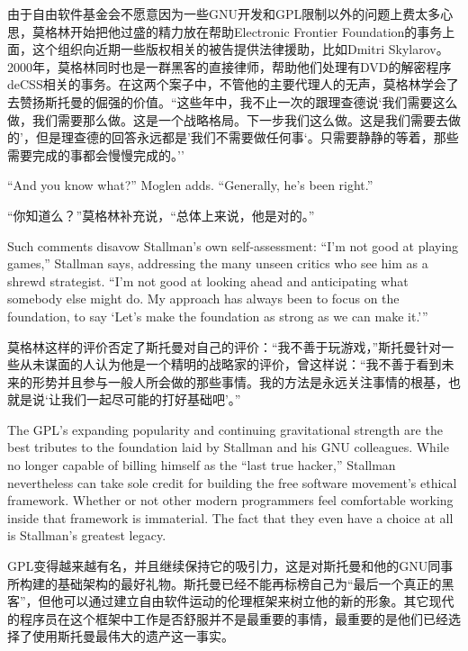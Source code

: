 \ifdefined\chs
由于自由软件基金会不愿意因为一些GNU开发和GPL限制以外的问题上费太多心思，莫格林开始把他过盛的精力放在帮助Electronic Frontier Foundation的事务上面，这个组织向近期一些版权相关的被告提供法律援助，比如Dmitri Skylarov。2000年，莫格林同时也是一群黑客的直接律师，帮助他们处理有DVD的解密程序deCSS相关的事务。在这两个案子中，不管他的主要代理人的无声，莫格林学会了去赞扬斯托曼的倔强的价值。``这些年中，我不止一次的跟理查德说`我们需要这么做，我们需要那么做。这是一个战略格局。下一步我们这么做。这是我们需要去做的'，但是理查德的回答永远都是'我们不需要做任何事`。只需要静静的等着，那些需要完成的事都会慢慢完成的。''

\fi

\ifdefined\eng
``And you know what?'' Moglen adds. ``Generally, he's been right.''
\fi

\ifdefined\chs
``你知道么？''莫格林补充说，``总体上来说，他是对的。''
\fi

\ifdefined\eng
Such comments disavow Stallman's own self-assessment: ``I'm not good at playing games,'' Stallman says, addressing the many unseen critics who see him as a shrewd strategist. ``I'm not good at looking ahead and anticipating what somebody else might do. My approach has always been to focus on the foundation, to say `Let's make the foundation as strong as we can make it.'\hspace{0.01in}''
\fi

\ifdefined\chs
莫格林这样的评价否定了斯托曼对自己的评价：``我不善于玩游戏，''斯托曼针对一些从未谋面的人认为他是一个精明的战略家的评价，曾这样说：``我不善于看到未来的形势并且参与一般人所会做的那些事情。我的方法是永远关注事情的根基，也就是说`让我们一起尽可能的打好基础吧'。''
\fi

\ifdefined\eng
The GPL's expanding popularity and continuing gravitational strength are the best tributes to the foundation laid by Stallman and his GNU colleagues. While no longer capable of billing himself as the ``last true hacker,'' Stallman nevertheless can take sole credit for building the free software movement's ethical framework. Whether or not other modern programmers feel comfortable working inside that framework is immaterial. The fact that they even have a choice at all is Stallman's greatest legacy.
\fi

\ifdefined\chs
GPL变得越来越有名，并且继续保持它的吸引力，这是对斯托曼和他的GNU同事所构建的基础架构的最好礼物。斯托曼已经不能再标榜自己为``最后一个真正的黑客''，但他可以通过建立自由软件运动的伦理框架来树立他的新的形象。其它现代的程序员在这个框架中工作是否舒服并不是最重要的事情，最重要的是他们已经选择了使用斯托曼最伟大的遗产这一事实。
\fi

